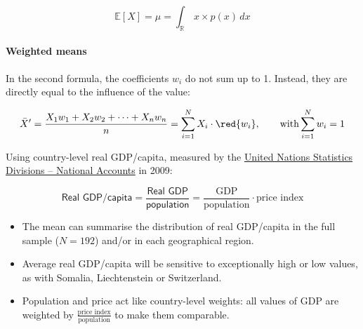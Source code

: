 $$\mathbb{E}[X] = \mu = \int_{\mathbb{R}} \, x \times p(x) \, dx$$



\paragraph{Weighted means}

% 
% 
% 





In the second formula, the coefficients $w_i$ do not sum up to 1. Instead, they are directly equal to the influence of the value:

$$\bar{X}' = \frac{X_1 w_1 + X_2 w_2 + \cdots + X_n w_n}{n} = \sum_{i=1}^N X_i \cdot \red{w_i}, \qquad \text{with} \sum_{i=1}^N w_i = 1$$


Using country-level real GDP/capita, measured by the \href{http://unstats.un.org/unsd/snaama/}{United Nations Statistics Divisions -- National Accounts} in 2009:

$$\textsf{Real GDP/capita} = \frac{\textsf{Real GDP}}{\textsf{population}} = \frac{\text{GDP}}{\text{population}} \cdot \text{price index}$$

\begin{itemize}
	\item The mean can summarise the distribution of real GDP/capita in the full sample ($N = 192$) and/or in each geographical region.
	
	\item Average real GDP/capita will be sensitive to exceptionally high or low values, as with Somalia, Liechtenstein or Switzerland.
			
	\item Population and price act like country-level weights: all values of GDP are weighted by $\frac{\text{price index}}{\text{population}}$ to make them comparable.
\end{itemize}

